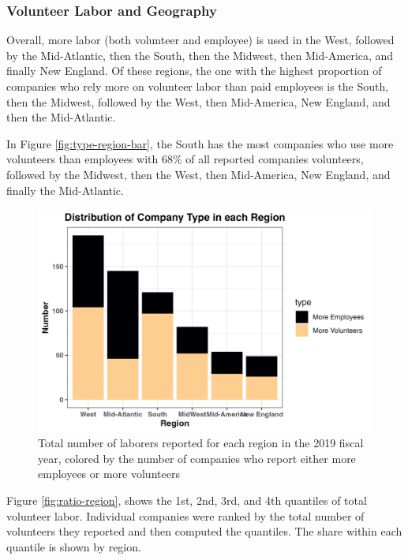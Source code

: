 \documentclass[Dance Data
Project,article,submit,moreauthors,pdftex]{mdpi}
\begin{document}
\hypertarget{volunteer-labor-and-geography}{%
\subsubsection{Volunteer Labor and
Geography}\label{volunteer-labor-and-geography}}

Overall, more labor (both volunteer and employee) is used in the West,
followed by the Mid-Atlantic, then the South, then the Midwest, then
Mid-America, and finally New England. Of these regions, the one with the
highest proportion of companies who rely more on volunteer labor than
paid employees is the South, then the Midwest, followed by the West,
then Mid-America, New England, and then the Mid-Atlantic.

In Figure \ref{fig:type-region-bar}, the South has the most companies
who use more volunteers than employees with 68\% of all reported
companies volunteers, followed by the Midwest, then the West, then
Mid-America, New England, and finally the Mid-Atlantic.

\begin{figure}[H]
\includegraphics[width=0.9\linewidth,]{../images/type_region_bar} \caption{\label{fig:type-region-bar}Total number of laborers reported for each region in the 2019 fiscal year, colored by the number of companies who report either more employees or more volunteers}\label{fig:unnamed-chunk-14}
\end{figure}

Figure \ref{fig:ratio-region}, shows the 1st, 2nd, 3rd, and 4th
quantiles of total volunteer labor. Individual companies were ranked by
the total number of volunteers they reported and then computed the
quantiles. The share within each quantile is shown by region.
\end{document}
